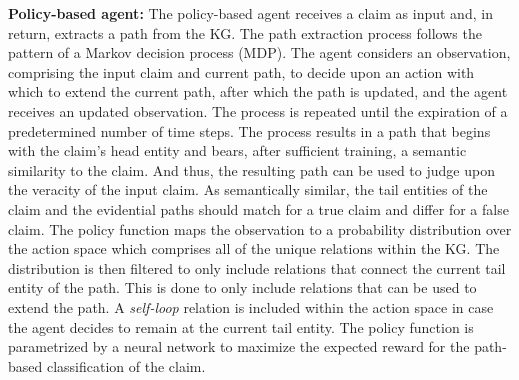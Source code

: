 \noindent \textbf{Policy-based agent: } The policy-based agent receives a claim as input and, in return, extracts a path from the KG. The path extraction process follows the pattern of a Markov decision process (MDP). The agent considers an observation, comprising the input claim and current path, to decide upon an action with which to extend the current path, after which the path is updated, and the agent receives an updated observation. The process is repeated until the expiration of a predetermined number of time steps.
The process results in a path that begins with the claim's head entity and bears, %
after sufficient training, a semantic similarity to the claim. And thus, the resulting path can be used to judge upon the veracity of the input claim. As semantically similar, the tail entities of the claim and the evidential paths should match for a true claim and differ for a false claim.
The policy function maps the observation to a probability distribution over the action space which comprises all of the unique relations within the KG. The distribution is then filtered to only include relations that connect the current tail entity of the path. This is done to only include relations that can be used to extend the path. A \textit{self-loop} relation is included within the action space in case the agent decides to remain at the current tail entity. %
The policy function is parametrized by a neural network to maximize the expected reward for the path-based classification of the claim.

